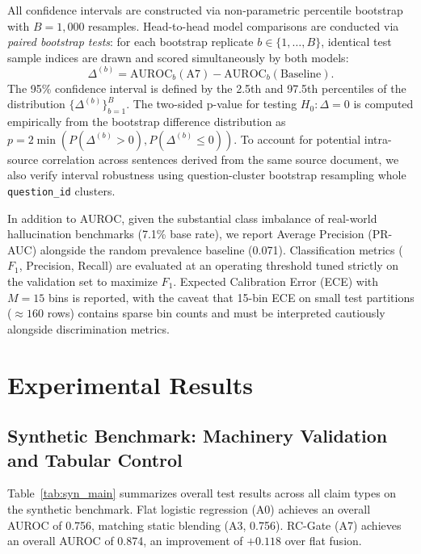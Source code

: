 \documentclass[pdflatex,sn-mathphys,Numbered]{sn-jnl}
\begin{document}
All confidence intervals are constructed via non-parametric percentile bootstrap~\cite{efron1993bootstrap} with $B=1,000$ resamples. Head-to-head model comparisons are conducted via \emph{paired bootstrap tests}: for each bootstrap replicate $b \in \{1, \dots, B\}$, identical test sample indices are drawn and scored simultaneously by both models:
\begin{equation}
\Delta^{(b)} = \mathrm{AUROC}_b(\text{A7}) - \mathrm{AUROC}_b(\text{Baseline}).
\end{equation}
The 95\% confidence interval is defined by the 2.5th and 97.5th percentiles of the distribution $\{\Delta^{(b)}\}_{b=1}^B$. The two-sided p-value for testing $H_0: \Delta = 0$ is computed empirically from the bootstrap difference distribution as $p = 2 \min(P(\Delta^{(b)} > 0), P(\Delta^{(b)} \le 0))$. To account for potential intra-source correlation across sentences derived from the same source document, we also verify interval robustness using question-cluster bootstrap resampling whole \texttt{question\_id} clusters.

In addition to AUROC, given the substantial class imbalance of real-world hallucination benchmarks (7.1\% base rate), we report Average Precision (PR-AUC) alongside the random prevalence baseline (0.071). Classification metrics ($F_1$, Precision, Recall) are evaluated at an operating threshold tuned strictly on the validation set to maximize $F_1$. Expected Calibration Error (ECE) with $M=15$ bins is reported, with the caveat that 15-bin ECE on small test partitions ($\approx 160$ rows) contains sparse bin counts and must be interpreted cautiously alongside discrimination metrics.

\section{Experimental Results}\label{sec:results}

\subsection{Synthetic Benchmark: Machinery Validation and Tabular Control}\label{subsec:results_synthetic}

Table~\ref{tab:syn_main} summarizes overall test results across all claim types on the synthetic benchmark. Flat logistic regression (A0) achieves an overall AUROC of 0.756, matching static blending (A3, 0.756). RC-Gate (A7) achieves an overall AUROC of 0.874, an improvement of $+0.118$ over flat fusion.
\end{document}

